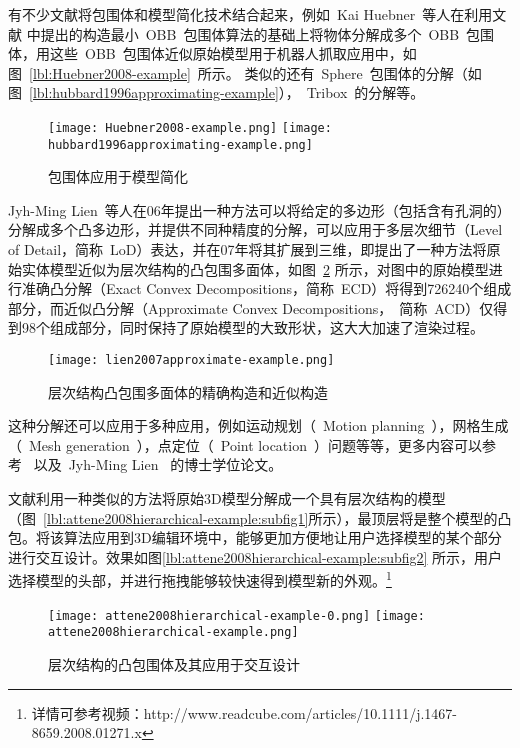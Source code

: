 有不少文献将包围体和模型简化技术结合起来，例如~Kai Huebner~等人\cite{huebner2008minimum}在利用文献
中提出的构造最小~OBB~包围体算法的基础上将物体分解成多个~OBB~包围体，用这些~OBB~包围体近似原始模型用于机器人抓取应用中，如图~\ref{lbl:Huebner2008-example}~所示。
类似的还有~Sphere~包围体的分解\cite{hubbard1996approximating}（如图~\ref{lbl:hubbard1996approximating-example}），~Tribox~的分解\cite{crosnier1999tribox}等。
\begin{figure}[htbp]
  \centering
    {\texttt{[image: Huebner2008-example.png]}}
    {\texttt{[image: hubbard1996approximating-example.png]}}
  \caption{包围体应用于模型简化}
  \label{lbl:bounding-voluems-used-in-shape-approximation}
\end{figure}
Jyh-Ming Lien~\cite{lien2006approximate2d}等人在06年提出一种方法可以将给定的多边形（包括含有孔洞的）分解成多个凸多边形，并提供不同种精度的分解，可以应用于多层次细节（Level of
Detail，简称~LoD）表达，并在07年将其扩展到三维\cite{lien2007approximate3d}，即提出了一种方法将原始实体模型近似为层次结构的凸包围多面体，如图~\ref{lbl:lien2007approximate-example}
所示，对图中的原始模型进行准确凸分解（Exact Convex
Decompositions，简称~ECD）将得到726240个组成部分，而近似凸分解（Approximate Convex
Decompositions，~简称~ACD）仅得到98个组成部分，同时保持了原始模型的大致形状，这大大加速了渲染过程。
\begin{figure}[htbp]
\centering
\texttt{[image: lien2007approximate-example.png]}
\caption{层次结构凸包围多面体的精确构造和近似构造\cite{lien2007approximate3d}}
\label{lbl:lien2007approximate-example}
\end{figure}
这种分解还可以应用于多种应用，例如运动规划（~Motion planning~），网格生成（~Mesh generation~），点定位（~Point location~）问题等等，更多内容可以参考~ 以及~Jyh-Ming Lien~ 的博士学位论文\cite{lien2006approximatephd}。

文献利用一种类似的方法将原始3D模型分解成一个具有层次结构的模型（图~\ref{lbl:attene2008hierarchical-example:subfig1}所示），最顶层将是整个模型的凸包。将该算法应用到3D编辑环境中，能够更加方便地让用户选择模型的某个部分进行交互设计。效果如图\ref{lbl:attene2008hierarchical-example:subfig2} 所示，用户选择模型的头部，并进行拖拽能够较快速得到模型新的外观。\footnote{详情可参考视频：http://www.readcube.com/articles/10.1111/j.1467-8659.2008.01271.x }
\begin{figure}[htbp]
  \centering
    {\texttt{[image: attene2008hierarchical-example-0.png]}}
    {\texttt{[image: attene2008hierarchical-example.png]}}
  \caption{层次结构的凸包围体及其应用于交互设计\cite{attene2008hierarchical}}
  \label{lbl:attene2008hierarchical-example}
\end{figure}

